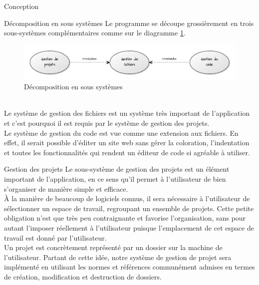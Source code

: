 \documentclass[a4paper, 12pt]{report}
\begin{document}
	\begin{part}{Conception}
		\begin{chapter}{Décomposition en sous systèmes}
			Le programme se découpe grossièrement en trois sous-systèmes complémentaires comme sur le diagramme \ref{poulpe}.
			\begin{figure}[h]
				\begin{center}
					\includegraphics[width=17cm]{images/decompositionSousSystemes.jpg}
					\caption{Décomposition en sous systèmes}
					\label{poulpe}
				\end{center}
			\end{figure}~\\
			Le système de gestion des fichiers est un système très important de l'application et c'est pourquoi il est requis
			par le système de gestion des projets.\\
			Le système de gestion du code est vue comme une extension aux fichiers. En effet, il serait possible d'éditer un
			site web sans gérer la coloration, l'indentation et toutes les fonctionnalités qui rendent un éditeur de code si agréable à utiliser.
			
			\begin{section}{Gestion des projets}
				Le sous-système de gestion des projets est un élément important de l'application, en ce sens qu'il permet à l'utilisateur
				de bien s'organiser de manière simple et efficace.\\


				À la manière de beaucoup de logiciels connus, il sera nécessaire à l'utilisateur de sélectionner un espace de travail,
				regroupant un ensemble de projets. Cette petite obligation n'est que très peu contraignante et favorise l'organisation, 
				sans pour autant l'imposer réellement à l'utilisateur puisque l'emplacement de cet espace de travail est donné par l'utilisateur.\\


				Un projet est concrètement représenté par un dossier sur la machine de l'utilisateur. Partant de cette idée, notre système
				de gestion de projet sera implémenté en utilisant les normes et références communément admises en termes de création,
				modification et destruction de dossiers.\\



\end{section}
\end{chapter}
\end{part}
\end{document}
